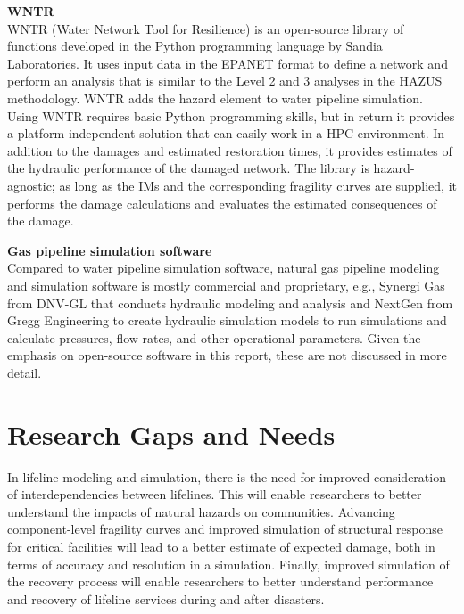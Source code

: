 \noindent\textbf{WNTR} \\WNTR (Water Network Tool for Resilience) is an open-source library of functions developed in the Python programming language by Sandia Laboratories. It uses input data in the EPANET format to define a network and perform an analysis that is similar to the Level 2 and 3 analyses in the HAZUS methodology. WNTR adds the hazard element to water pipeline simulation. Using WNTR requires basic Python programming skills, but in return it provides a platform-independent solution that can easily work in a HPC environment. In addition to the damages and estimated restoration times, it provides estimates of the hydraulic performance of the damaged network. The library is hazard-agnostic; as long as the IMs and the corresponding fragility curves are supplied, it performs the damage calculations and evaluates the estimated consequences of the damage.
\newline

\noindent\textbf{Gas pipeline simulation software} \\Compared to water pipeline simulation software, natural gas pipeline modeling and simulation software is mostly commercial and proprietary, e.g., Synergi Gas from DNV-GL that conducts hydraulic modeling and analysis and NextGen from Gregg Engineering to create hydraulic simulation models to run simulations and calculate pressures, flow rates, and other operational parameters. Given the emphasis on open-source software in this report, these are not discussed in more detail.

\section{Research Gaps and Needs}
\label{sec:perf_pipeline_gaps}

In lifeline modeling and simulation, there is the need for improved consideration of interdependencies between lifelines. This will enable researchers to better understand the impacts of natural hazards on communities. Advancing component-level fragility curves and improved simulation of structural response for critical facilities will lead to a better estimate of expected damage, both in terms of accuracy and resolution in a simulation. Finally, improved simulation of the recovery process will enable researchers to better understand performance and recovery of lifeline services during and after disasters.
